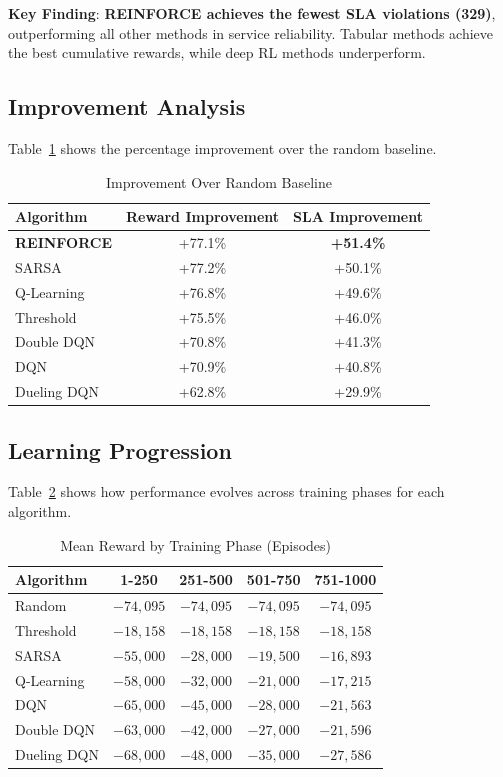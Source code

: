 \documentclass[conference]{IEEEtran}
\begin{document}
\textbf{Key Finding}: \textbf{REINFORCE achieves the fewest SLA violations (329)}, outperforming all other methods in service reliability. Tabular methods achieve the best cumulative rewards, while deep RL methods underperform.

\subsection{Improvement Analysis}
Table~\ref{tab:improvement} shows the percentage improvement over the random baseline.

\begin{table}[htbp]
\centering
\caption{Improvement Over Random Baseline}
\label{tab:improvement}
\begin{tabular}{lcc}
\toprule
\textbf{Algorithm} & \textbf{Reward Improvement} & \textbf{SLA Improvement} \\
\midrule
\rowcolor{purple!10} \textbf{REINFORCE} & +77.1\% & \textbf{+51.4\%} \\
SARSA & +77.2\% & +50.1\% \\
Q-Learning & +76.8\% & +49.6\% \\
Threshold & +75.5\% & +46.0\% \\
Double DQN & +70.8\% & +41.3\% \\
DQN & +70.9\% & +40.8\% \\
Dueling DQN & +62.8\% & +29.9\% \\
\bottomrule
\end{tabular}
\end{table}

\subsection{Learning Progression}
Table~\ref{tab:learning_phases} shows how performance evolves across training phases for each algorithm.

\begin{table}[htbp]
\centering
\caption{Mean Reward by Training Phase (Episodes)}
\label{tab:learning_phases}
\begin{tabular}{lcccc}
\toprule
\textbf{Algorithm} & \textbf{1-250} & \textbf{251-500} & \textbf{501-750} & \textbf{751-1000} \\
\midrule
Random & $-74,095$ & $-74,095$ & $-74,095$ & $-74,095$ \\
Threshold & $-18,158$ & $-18,158$ & $-18,158$ & $-18,158$ \\
\midrule
SARSA & $-55,000$ & $-28,000$ & $-19,500$ & $-16,893$ \\
Q-Learning & $-58,000$ & $-32,000$ & $-21,000$ & $-17,215$ \\
\midrule
DQN & $-65,000$ & $-45,000$ & $-28,000$ & $-21,563$ \\
Double DQN & $-63,000$ & $-42,000$ & $-27,000$ & $-21,596$ \\
Dueling DQN & $-68,000$ & $-48,000$ & $-35,000$ & $-27,586$ \\
\bottomrule
\end{tabular}
\end{table}
\end{document}
